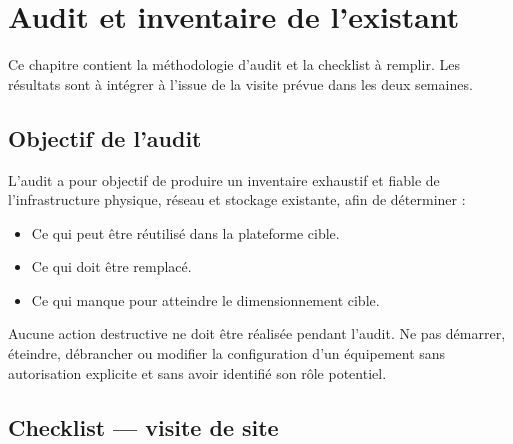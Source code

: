 \chapter{Audit et inventaire de l'existant}
\label{chap:audit}

\begin{todobox}
Ce chapitre contient la méthodologie d'audit et la checklist à remplir. Les résultats sont à intégrer à l'issue de la visite prévue dans les deux semaines.
\end{todobox}

\section{Objectif de l'audit}
L'audit a pour objectif de produire un inventaire exhaustif et fiable de l'infrastructure physique, réseau et stockage existante, afin de déterminer :
\begin{itemize}
  \item Ce qui peut être réutilisé dans la plateforme cible.
  \item Ce qui doit être remplacé.
  \item Ce qui manque pour atteindre le dimensionnement cible.
\end{itemize}

\begin{warnbox}
Aucune action destructive ne doit être réalisée pendant l'audit. Ne pas démarrer, éteindre, débrancher ou modifier la configuration d'un équipement sans autorisation explicite et sans avoir identifié son rôle potentiel.
\end{warnbox}

\section{Checklist — visite de site}


